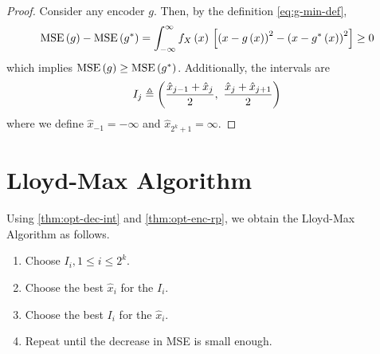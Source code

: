 \documentclass[twoside]{article}
\begin{document}
\begin{proof}
    Consider any encoder \(g\). Then, by the definition \eqref{eq:g-min-def},
    \begin{equation}
        \mathrm{MSE}\left(g\right) - \mathrm{MSE}\left(g^{*}\right) = \int_{-\infty}^{\infty}f_X\left(x\right){}\left[\left(x-g\left(x\right)\right)^2 - \left(x-g^{*}\left(x\right)\right)^2\right] \ge 0
    \end{equation}
    which implies \(\mathrm{MSE}\left(g\right) \ge \mathrm{MSE}\left(g^{*}\right)\). Additionally, the intervals are
    \begin{equation}
        I_j \triangleq \brak{\frac{\hat{x}_{j-1}+\hat{x}_j}{2},\ \frac{\hat{x}_j+\hat{x}_{j+1}}{2}}
        \label{eq:I-j-def}
    \end{equation}
    where we define \(\hat{x}_{-1} = -\infty\) and \(\hat{x}_{2^k+1} = \infty\).
\end{proof}

\section{Lloyd-Max Algorithm}

Using \autoref{thm:opt-dec-int} and \autoref{thm:opt-enc-rp}, we obtain the Lloyd-Max Algorithm as follows.

\begin{enumerate}
    \item Choose \(I_i, 1 \le i \le 2^k\).
\item Choose the best \(\hat{x}_i\) for the \(I_i\).
    \item Choose the best \(I_i\) for the \(\hat{x}_i\).
    \item Repeat until the decrease in MSE is small enough.
\end{enumerate}
\end{document}
